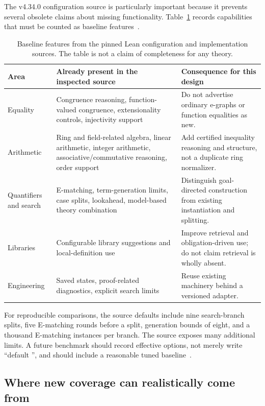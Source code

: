 The v4.34.0 configuration source is particularly important because it prevents several obsolete claims about missing functionality. Table~\ref{tab:baseline} records capabilities that must be counted as baseline features~\cite{grindconfig,grindtypes}.

\begin{table}[htbp]
\centering\small
\begin{tabularx}{\textwidth}{@{}p{}Xp{}@{}}
\toprule
Area & Already present in the inspected source & Consequence for this design \\
\midrule
Equality & Congruence reasoning, function-valued congruence, extensionality controls, injectivity support & Do not advertise ordinary e-graphs or function equalities as new. \\
Arithmetic & Ring and field-related algebra, linear arithmetic, integer arithmetic, associative/commutative reasoning, order support & Add certified inequality reasoning and structure, not a duplicate ring normalizer. \\
Quantifiers and search & E-matching, term-generation limits, case splits, lookahead, model-based theory combination & Distinguish goal-directed construction from existing instantiation and splitting. \\
Libraries & Configurable library suggestions and local-definition use & Improve retrieval and obligation-driven use; do not claim retrieval is wholly absent. \\
Engineering & Saved states, proof-related diagnostics, explicit search limits & Reuse existing machinery behind a versioned adapter. \\
\bottomrule
\end{tabularx}
\caption{Baseline features from the pinned Lean configuration and implementation sources. The table is not a claim of completeness for any theory.}
\label{tab:baseline}
\end{table}

For reproducible comparisons, the source defaults include nine search-branch splits, five E-matching rounds before a split, generation bounds of eight, and a thousand E-matching instances per branch. The source exposes many additional limits. A future benchmark should record effective options, not merely write ``default \grind{}'', and should include a reasonable tuned baseline~\cite{grindconfig}.

\subsection{Where new coverage can realistically come from}

